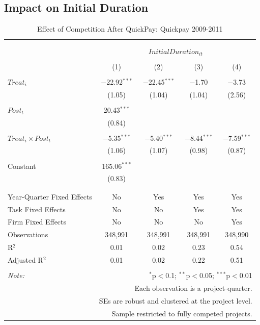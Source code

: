 \documentclass[
]{article}
\begin{document}
\hypertarget{impact-on-initial-duration}{%
\subsection{Impact on Initial
Duration}\label{impact-on-initial-duration}}

\begin{table}[H] \centering 
  \caption{Effect of Competition After QuickPay: Quickpay 2009-2011} 
  \label{} 
\small 
\begin{tabular}{@{\extracolsep{-2pt}}lcccc} 
\\[-1.8ex]\hline 
\hline \\[-1.8ex] 
\\[-1.8ex] & \multicolumn{4}{c}{$InitialDuration_{it}$} \\ 
\\[-1.8ex] & (1) & (2) & (3) & (4)\\ 
\hline \\[-1.8ex] 
 $Treat_i$ & $-$22.92$^{***}$ & $-$22.45$^{***}$ & $-$1.70 & $-$3.73 \\ 
  & (1.05) & (1.04) & (1.04) & (2.56) \\ 
  & & & & \\ 
 $Post_t$ & 20.43$^{***}$ &  &  &  \\ 
  & (0.84) &  &  &  \\ 
  & & & & \\ 
 $Treat_i \times Post_t$ & $-$5.35$^{***}$ & $-$5.40$^{***}$ & $-$8.44$^{***}$ & $-$7.59$^{***}$ \\ 
  & (1.06) & (1.07) & (0.98) & (0.87) \\ 
  & & & & \\ 
 Constant & 165.06$^{***}$ &  &  &  \\ 
  & (0.83) &  &  &  \\ 
  & & & & \\ 
\hline \\[-1.8ex] 
Year-Quarter Fixed Effects & No & Yes & Yes & Yes \\ 
Task Fixed Effects & No & No & Yes & Yes \\ 
Firm Fixed Effects & No & No & No & Yes \\ 
Observations & 348,991 & 348,991 & 348,991 & 348,990 \\ 
R$^{2}$ & 0.01 & 0.02 & 0.23 & 0.54 \\ 
Adjusted R$^{2}$ & 0.01 & 0.02 & 0.22 & 0.51 \\ 
\hline 
\hline \\[-1.8ex] 
\textit{Note:}  & \multicolumn{4}{r}{$^{*}$p$<$0.1; $^{**}$p$<$0.05; $^{***}$p$<$0.01} \\ 
 & \multicolumn{4}{r}{Each observation is a project-quarter.} \\ 
 & \multicolumn{4}{r}{SEs are robust and clustered at the project level.} \\ 
 & \multicolumn{4}{r}{Sample restricted to fully competed projects.} \\ 
\end{tabular} 
\end{table}
\end{document}
